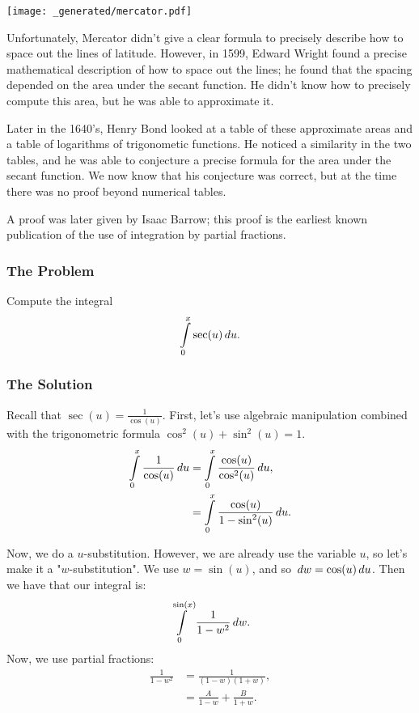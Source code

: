 \texttt{[image: \_generated/mercator.pdf]}

Unfortunately, Mercator didn't give a clear formula to precisely describe how to space out the lines of latitude. 
However, in 1599, Edward Wright found a precise mathematical description of how to space out the lines; he found that the spacing depended on the area under the secant function.
He didn't know how to precisely compute this area, but he was able to approximate it. 

Later in the 1640's, Henry Bond looked at a table of these approximate areas and a table of logarithms of trigonometic functions. 
He noticed a similarity in the two tables, and he was able to conjecture a precise formula for the area under the secant function. 
We now know that his conjecture was correct, but at the time there was no proof beyond numerical tables.

A proof was later given by Isaac Barrow; this proof is the earliest known publication of the use of integration by partial fractions.

\subsubsection*{The Problem}

Compute the integral
\begin{equation}
\int\limits_0^x \sec(u) \, du.
\end{equation}

\subsubsection*{The Solution}

Recall that \(\sec(u) = \frac{1}{\cos(u)}\). First, let's use algebraic manipulation combined with the trigonometric formula \(\cos^2(u) + \sin^2(u) = 1\).
\begin{align}
\int\limits_0^x \frac{1}{\cos(u)} \, du & = \int\limits_0^x \frac{\cos(u)}{\cos^2(u)} \, du, \\
    & = \int\limits_0^x \frac{\cos(u)}{1 - \sin^2(u)} \, du.
\end{align}

Now, we do a \(u\)-substitution. However, we are already use the variable \(u\), so let's make it a "\(w\)-substitution". 
We use \(w = \sin(u)\), and so \(\, dw = \cos(u) \, du\). Then we have that our integral is:
\begin{equation}
\int\limits_0^{\sin(x)} \frac{1}{1 - w^2} \, dw.
\end{equation}
 Now, we use partial fractions: 
\begin{align}
\frac{1}{1 - w^2} & = \frac{1}{(1 - w)(1 + w)},\\
    & = \frac{A}{1 - w} + \frac{B}{1 + w}.
\end{align}


